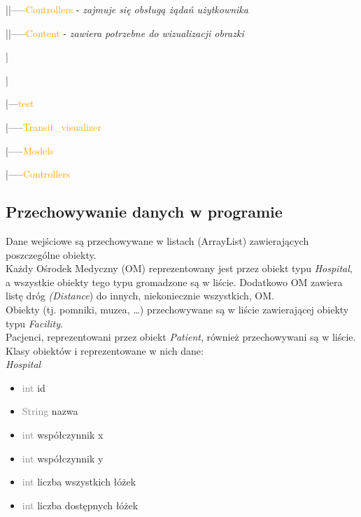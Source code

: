\documentclass[]{article}
\begin{document}
    |\hspace{15mm}|-----\textcolor{orange}{Controllers} -\textit{ zajmuje się obsługą żądań użytkownika}

    |\hspace{15mm}|-----\textcolor{orange}{Content} -\textit{ zawiera potrzebne do wizualizacji obrazki}

    |

    |

    |---\textcolor{orange}{test}

    \hspace{5mm} |-----\textcolor{orange}{Transit\_visualizer}

    \hspace{16mm}|-----\textcolor{orange}{Models}

    \hspace{16mm}|-----\textcolor{orange}{Controllers}

    \subsection{Przechowywanie danych w programie} %
    Dane wejściowe są przechowywane w listach (ArrayList) zawierających poszczególne obiekty. \\
    Każdy Ośrodek Medyczny (OM) reprezentowany jest przez obiekt typu\textit{ Hospital}, a wszystkie obiekty tego typu gromadzone są w liście. Dodatkowo OM zawiera listę dróg \textit{(Distance}) do innych, niekoniecznie wszystkich, OM.\\
    Obiekty (tj. pomniki, muzea, \ldots) przechowywane są w liście zawierającej obiekty typu \textit{Facility}.\\
    Pacjenci, reprezentowani przez obiekt \textit{Patient}, również przechowywani są w liście.\\

    Klasy obiektów i reprezentowane w nich dane:\\


    \textit{Hospital}
    \begin{itemize}
        \item  \textcolor{gray}{int} id
        \item  \textcolor{gray}{String} nazwa
        \item  \textcolor{gray}{int} współczynnik x
        \item \textcolor{gray}{int}  współczynnik y
        \item \textcolor{gray}{int}  liczba wszystkich łóżek
        \item \textcolor{gray}{int}  liczba dostępnych łóżek
    \end{itemize}
\end{document}
